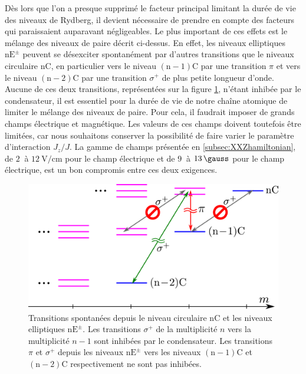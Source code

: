 \noindent Dès lors que l'on a presque supprimé le facteur principal limitant la durée de vie des niveaux de Rydberg, il devient nécessaire de prendre en compte des facteurs qui paraissaient auparavant négligeables.
Le plus important de ces effets est le mélange des niveaux de paire décrit ci-dessus.
En effet, les niveaux elliptiques $\mathrm{nE^{\pm}}$ peuvent se désexciter spontanément par d'autres transitions que le niveaux circulaire $\mathrm{nC}$, en particulier vers le niveau $\mathrm{(n-1)C}$ par une transition $\pi$ et vers le niveau $\mathrm{(n-2)C}$ par une transition $\sigma^+$ de plus petite longueur d'onde.
Aucune de ces deux transitions, représentées sur la figure \ref{fig:sigma_pi}, n'étant inhibée par le condensateur, il est essentiel pour la durée de vie de notre chaîne atomique de limiter le mélange des niveaux de paire.
Pour cela, il faudrait imposer de grands champs électrique et magnétique.
Les valeurs de ces champs doivent toutefois être limitées, car nous souhaitons conserver la possibilité de faire varier le paramètre d'interaction $J_z/J$.
La gamme de champs présentée en \ref{subsec:XXZhamiltonian}, de $\SI{2}{}$ à $\SI{12}{\V/\cm}$ pour le champ électrique et de $\SI{9}{}$ à $\SI{13}{\gauss}$ pour le champ électrique, est un bon compromis entre ces deux exigences.
\begin{figure}[h]
\centering
\includegraphics[width=0.7 \linewidth]{figures/circsim/sigma_pi}
\caption[Transitions spontanées depuis les niveaux elliptiques $\mathrm{nE^\pm}$]{
Transitions spontanées depuis le niveau circulaire $\mathrm{nC}$ et les niveaux elliptiques $\mathrm{nE^\pm}$.
Les transitions $\sigma^+$ de la multiplicité $n$ vers la multiplicité $n-1$ sont inhibées par le condensateur.
Les transitions $\pi$ et $\sigma^+$ depuis les niveaux $\mathrm{nE^\pm}$ vers les niveaux $\mathrm{(n-1)C}$ et $\mathrm{(n-2)C}$ respectivement ne sont pas inhibées.
}
\label{fig:sigma_pi}
\end{figure}

